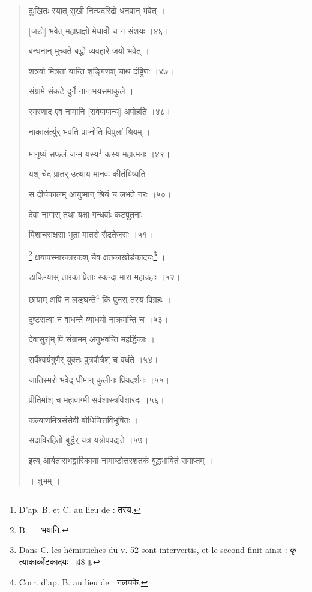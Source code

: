 \documentclass[a4paper, 11pt, oneside, french, landscape, twocolumn]{article}
\begin{document}
\begin{quotation}
\texthindi{दुःखितः स्यात् सुखी नित्यदरिद्रो धनवान् भवेत् ।}

\texthindi{[जडो] भवेत् महाप्राज्ञो मेधावी च न संशयः ।४६।}

\bigskip

\texthindi{बन्धनान् मुच्यते बद्धो व्यवहारे जयो भवेत् ।}

\texthindi{शत्रवो मित्रतां यान्ति शृङ्गिणश् चाथ दंष्ट्रिणः ।४७।}

\bigskip

\texthindi{संग्रामे संकटे दुर्गे नानाभयसमाकुले ।}

\texthindi{स्मरणाद् एव नामानि [सर्वपापान्य्] अपोहति ।४८।}

\bigskip

\texthindi{नाकालंर्त्युर् भवति प्राप्नोति विपुलां श्रियम् ।}

\texthindi{मानुष्यं सफलं जन्म यस्य}\footnote{D'ap. B. et C. au lieu de : \texthindi{तस्य.}} \texthindi{कस्य महात्मनः ।४९।}

\bigskip

\texthindi{यश् चेदं प्रातर् उत्थाय मानवः कीर्तयिष्यति ।}

\texthindi{स दीर्घकालम् आयुष्मान् श्रियं च लभते नरः ।५०।}

\bigskip

\texthindi{देवा नागास् तथा यक्षा गन्धर्वाः कटपूतनाः ।}

\texthindi{पिशाचराक्षसा भूता मातरो रौद्रतेजसः ।५१।}

\bigskip

\footnote{B. --- \texthindi{भयानि.}} \texthindi{क्षयापस्मारकारकश् चैव क्षतकाखोर्डकादयः}\footnote{Dans C. les hémistiches du v. 52 sont intervertis, et le second finit ainsi : \texthindi{कृत्याकार्कोटकादयः} \texthindi{॥}48\texthindi{॥}.} \texthindi{।}

\texthindi{डाकिन्यास् तारका प्रेताः स्कन्दा मारा महाग्रहाः ।५२।}

\bigskip

\texthindi{छायाम् अपि न लङ्घन्ते}\footnote{Corr. d'ap. B. au lieu de : \texthindi{नलघके.}} \texthindi{किं पुनस् तस्य विग्रहः ।}

\texthindi{दुष्टसत्वा न वाधन्ते व्याधयो नाक्रमन्ति च ।५३।}

\bigskip

\texthindi{देवासुर[म्]पि संग्रामम् अनुभवन्ति महर्द्धिकाः ।}

\texthindi{सर्वैश्वर्यगुणैर् युक्तः पुत्रपौत्रैश् च वर्धते ।५४।}

\bigskip

\texthindi{जातिस्मरो भवेद् धीमान् कुलीनः प्रियदर्शनः ।५५।}

\bigskip

\texthindi{प्रीतिमांश् च महावाग्मी सर्वशास्त्रविशारदः ।५६।}

\bigskip

\texthindi{कल्याणमित्रसंसेवी बोधिचित्तविभूषितः ।}

\texthindi{सदाविरहितो बुद्धैर् यत्र यत्रोपपद्यते ।५७।}

\bigskip

\texthindi{इत्य् आर्यताराभट्टारिकाया नामाष्टोत्तरशतकं बुद्धभाषितं समाप्तम् ।}

\bigskip

\texthindi{। शुभम् ।}
\end{quotation}
\clearpage
\end{document}
